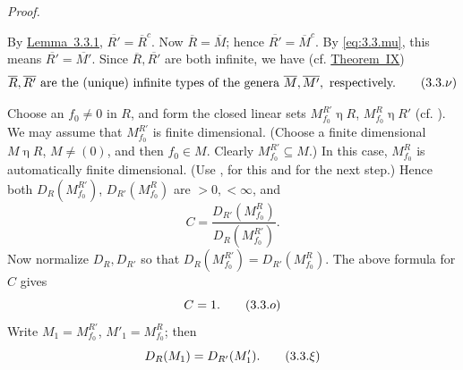 \documentclass[b5paper,twoside]{article}
\newcommand{\thmref}[2]{\hyperref[#1]{\mbox{Theorem~#2}}}
\newcommand{\lemref}[2]{\hyperref[#1]{\mbox{Lemma~#2}}}
\theoremstyle{mvnplain}
\renewenvironment{proof}[1][Proof]{%
  \par\addvspace{0.35\baselineskip}%
  \noindent\textit{#1.}\ \normalfont\ignorespaces
}{%
  \par\addvspace{0.35\baselineskip}%
}
\newcommand{\M}{\mathbf M}
\newcommand{\R}{\mathbf R}
\def\M{M}%
\def\R{R}%
\def\widetilde#1{#1}%
\def\mathfrak#1{#1}%
\begin{document}
\begin{proof}
By \lemref{lem:3.3.1}{3.3.1},
\(\widetilde{\overline{\R'}}=\widetilde{\overline{\R}}^{c}\). Now
\(\widetilde{\overline{\R}}=\widetilde{\overline{\M}}\); hence
\(\widetilde{\overline{\R'}}=\widetilde{\overline{\M}}^{c}\). By
\eqref{eq:3.3.mu}, this means
\(\widetilde{\overline{\R'}}=\widetilde{\overline{\M'}}\). Since
\(\overline{\R},\overline{\R'}\) are both infinite, we have (cf.
\thmref{thm:IX}{IX})
\begin{equation}
\begin{gathered}
\overline{\R},\overline{\R'}\text{ are the (unique) infinite types of the
genera }\widetilde{\overline{\M}},\widetilde{\overline{\M'}},
\text{ respectively.}
\end{gathered}
\tag{3.3.\ensuremath{\nu}}\label{eq:3.3.nu}
\end{equation}

Choose an \(f_0\ne0\) in \(\mathfrak R\), and form the closed linear sets
\(\mathfrak M_{f_0}^{\R'}\mathrel{\eta}\R\),
\(\mathfrak M_{f_0}^{\R}\mathrel{\eta}\R'\) (cf.
\cite[p.~143, Def.~5.1.1]{ref5}). We may assume that
\(\mathfrak M_{f_0}^{\R'}\) is finite dimensional. (Choose a finite
dimensional \(\mathfrak M\mathrel{\eta}\R\), \(\mathfrak M\ne(0)\), and then
\(f_0\in\mathfrak M\). Clearly
\(\mathfrak M_{f_0}^{\R'}\subseteq\mathfrak M\).) In this case,
\(\mathfrak M_{f_0}^{\R}\) is automatically finite dimensional. (Use
\cite[p.~182, Theorem~X]{ref5}, for this and for the next step.) Hence both
\(D_{\R}(\mathfrak M_{f_0}^{\R'})\),
\(D_{\R'}(\mathfrak M_{f_0}^{\R})\) are \(>0,<\infty\), and
\[
  C=\frac{D_{\R'}(\mathfrak M_{f_0}^{\R})}
          {D_{\R}(\mathfrak M_{f_0}^{\R'})}.
\]
Now normalize \(D_{\R},D_{\R'}\) so that
\(D_{\R}(\mathfrak M_{f_0}^{\R'})
=D_{\R'}(\mathfrak M_{f_0}^{\R})\). The above formula for \(C\) gives
\begin{equation}
  C=1.
  \tag{3.3.\ensuremath{o}}\label{eq:3.3.omicron}
\end{equation}
Write \(\mathfrak M_1=\mathfrak M_{f_0}^{\R'}\),
\(\mathfrak M'_1=\mathfrak M_{f_0}^{\R}\); then
\begin{equation}
  D_{\R}(\mathfrak M_1)=D_{\R'}(\mathfrak M'_1).
  \tag{3.3.\ensuremath{\xi}}\label{eq:3.3.xi}
\end{equation}


\end{proof}
\end{document}
